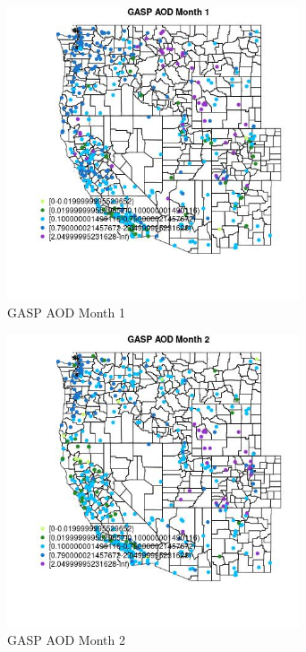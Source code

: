 \begin{figure} 
\centering  
\includegraphics[width=0.77\textwidth]{Code_Outputs/Report_ML_input_PM25_Step4_part_e_de_duplicated_aves_compiled_2019-05-14wNAs_MapObsMo1GASP_AOD.jpg} 
\caption{\label{fig:Report_ML_input_PM25_Step4_part_e_de_duplicated_aves_compiled_2019-05-14wNAsMapObsMo1GASP_AOD}GASP AOD Month 1} 
\end{figure} 
 

\clearpage 

\begin{figure} 
\centering  
\includegraphics[width=0.77\textwidth]{Code_Outputs/Report_ML_input_PM25_Step4_part_e_de_duplicated_aves_compiled_2019-05-14wNAs_MapObsMo2GASP_AOD.jpg} 
\caption{\label{fig:Report_ML_input_PM25_Step4_part_e_de_duplicated_aves_compiled_2019-05-14wNAsMapObsMo2GASP_AOD}GASP AOD Month 2} 
\end{figure} 
 

